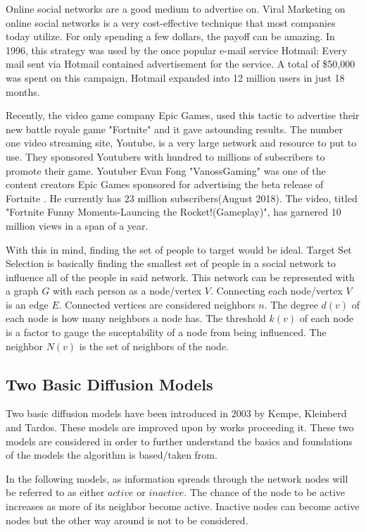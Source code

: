 Online social networks are a good medium to advertise on. Viral Marketing on online social networks is a very cost-effective technique that most companies today utilize. For only spending a few dollars, the payoff can be amazing.\cite{viralmarketing} In 1996, this strategy was used by the once popular e-mail service Hotmail: Every mail sent via Hotmail contained advertisement for the service. A total of \$50,000 was spent on this campaign. Hotmail expanded into 12 million users in just 18 months.\cite{viralmarketing} 

Recently, the video game company Epic Games, used this tactic to advertise their new battle royale game "Fortnite" and it gave astounding results. The number one video streaming site, Youtube, is a very large network and resource to put to use. They sponsored Youtubers with hundred to millions of subscribers to promote their game.\cite{sponsoredvideos} Youtuber Evan Fong "VanossGaming" was one of the content creators Epic Games sponsored for advertising the beta release of Fortnite \cite{vanoss}. He currently has 23 million subscribers(August 2018). The video, titled "Fortnite Funny Moments-Launcing the Rocket!(Gameplay)", has garnered 10 million views in a span of a year.

With this in mind, finding the set of people to target would be ideal. Target Set Selection is basically finding the smallest set of people in a social network to influence all of the people in said network.\cite{Kempe,chen,Shakarian:2012:LSN:2456719.2457081} This network can be represented with a graph $G$ with each person as a node/vertex $V$. Connecting each node/vertex $V$ is an edge $E$. Connected vertices are considered neighbors $n$. The degree $d(v)$ of each node is how many neighbors a node has. The threshold $k(v)$ of each node is a factor to gauge the suceptability of a node from being influenced. The neighbor $N(v)$ is the set of neighbors of the node. 

\subsection{Two Basic Diffusion Models}
Two basic diffusion models have been introduced in 2003 by Kempe, Kleinberd and Tardos.\cite{Kempe} These models are improved upon by works proceeding it. These two models are considered in order to further understand the basics and foundations of the models the algorithm is based/taken from.


In the following models, as information spreads through the network nodes will be referred to as either $active$ or $inactive$. The chance of the node to be active increases as more of its neighbor become active. Inactive nodes can become active nodes but the other way around is not to be considered. 
